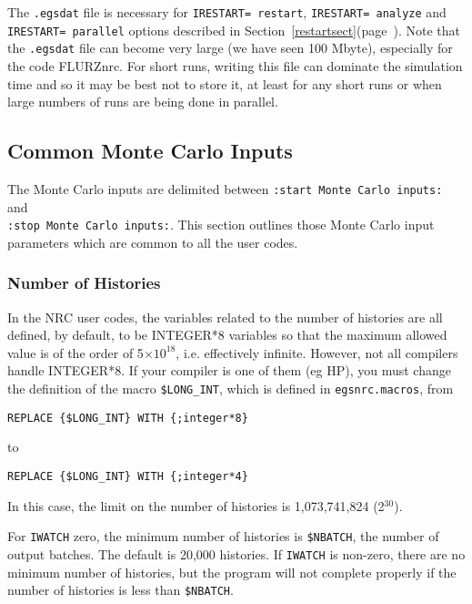 \documentclass[12pt,twoside]{article}  %
\newcommand{\lpage}[1]{(page~\pageref{#1})}
\begin{document}
The {\tt .egsdat} file is necessary for {\tt IRESTART= restart},
{\tt IRESTART= analyze} and {\tt IRESTART= parallel} options described in
Section~\ref{restartsect}\lpage{restartsect}.  Note that the {\tt .egsdat}
file can become very large (we have seen 100 Mbyte), especially for
the code FLURZnrc.  For short runs, writing this file can dominate the
simulation time and so it may be best not to store it, at least for any
short runs or when large numbers of runs are being done in parallel.

\subsection{Common Monte Carlo Inputs}
\label{MC_inputs}

The Monte Carlo inputs are delimited between
\verb+:start Monte Carlo inputs:+ and \\
\verb+:stop Monte Carlo inputs:+. This section outlines those
Monte Carlo input parameters which are common to all the user codes.

\subsubsection{Number of Histories}
\label{histsect}

In the NRC user codes, the variables related to the number of histories
are all defined, by default, to be INTEGER*8 variables so that the
maximum allowed value is of the order of 5$\times 10^{18}$, i.e.
effectively infinite.  However, not all compilers handle INTEGER*8. If
your compiler is one of them (eg HP), you must change the definition of
the macro {\tt \$LONG\_INT}, which is defined in {\tt egsnrc.macros}, from
\begin{verbatim}
REPLACE {$LONG_INT} WITH {;integer*8}
\end{verbatim}
to
\begin{verbatim}
REPLACE {$LONG_INT} WITH {;integer*4}
\end{verbatim}
In this case, the limit on the number of histories is 1,073,741,824
(2$^{30}$).

For {\tt IWATCH} zero, the minimum number of histories is {\tt \$NBATCH},
the number of output batches.
The default is 20,000 histories.
If {\tt IWATCH} is non-zero, there are no minimum number of histories,
but the program will not complete properly if the number of histories
is less than {\tt \$NBATCH}.
\end{document}
